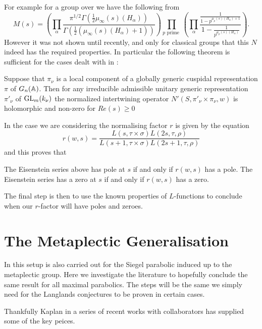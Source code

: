     For example for a group over \Q we have the following from \cite{langlandsEulerProductsa} 
    \[M(s) = \left( \prod_\alpha\frac{\pi^{1/2}\Gamma(\frac{1}{2}\mu_\infty(s)(H_\alpha))}{\Gamma(\frac{1}{2}(\mu_\infty(s)(H_\alpha) + 1))} \right)\prod_{p \text{ prime }} \left( \prod_\alpha \frac{\frac{1}{1 - p^{\mu_p(s)(H_\alpha) + 1}}}{1 - \frac{1}{p^{\mu_p(s)(H_\alpha) }}}\right).\]
     However it was not shown until recently, and only for classical groups that this \(N\) indeed has the required properties. In particular the following theorem is sufficient for the cases dealt with in \cite{jiangPolesCertainResidual2013}:
     \begin{Theorem}
        Suppose that \(\pi_\nu\) is a local component of a globally generic cuspidal representation \(\pi\) of \(G_n(\A)\). Then for any irreducible admissible unitary generic representation \(\pi'_\nu\) of \(\operatorname{GL}_m(k_\nu)\) the normalized intertwining operator \(N'(S, \pi'_\nu\times \pi_\nu, w)\) is holomorphic and non-zero for \(Re(s)\geq 0\)
     \end{Theorem}

     In the case we are considering the normalising factor \(r\) is given by the equation \cite[4A]{jiangPolesCertainResidual2013}
     \[r(w, s) = \frac{L(s, \tau\times \sigma)L(2s, \tau, \rho)}{L(s+1, \tau\times \sigma)L(2s+1, \tau, \rho)}\]
     and this proves that 

     \begin{Lemma}
        The Eisenstein series above has pole at \(s\) if and only if \(r(w,s)\) has a pole. The Eisenstein series has a zero at \(s\) if and only if \(r(w, s)\) has a zero.
     \end{Lemma}
     The final step is then to use the known properties of \(L\)-functions to conclude when our \(r\)-factor will have poles and zeroes. 


    \section{The Metaplectic Generalisation}
    In \cite[]{ginzburgTopFourierCoefficients2021} this setup is also carried out for the Siegel parabolic induced up to the metaplectic group. Here we investigate the literature to hopefully conclude the same result for all maximal parabolics. The steps will be the same we simply need for the Langlands conjectures to be proven in certain cases. 

    Thankfully Kaplan in a series of recent works with collaborators \cite{kaplanDoublingConstructionsComplete2021a}\cite{kaplanDoublingConstructionsTensor2020}\cite{caiDoublingConstructionsGlobal2024} has supplied some of the key peices. 

